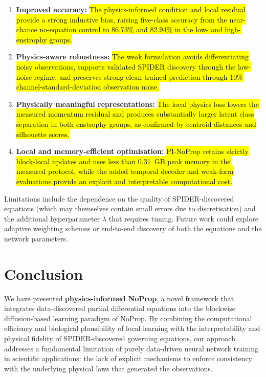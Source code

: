 \documentclass[preprint,12pt]{elsarticle}
\newcommand{\rev}[1]{\hl{#1}}
\begin{document}
\begin{enumerate}
    \item \textbf{Improved accuracy:} \rev{The physics-informed condition and local residual provide a strong inductive bias, raising five-class accuracy from the near-chance no-equation control to 86.73\% and 82.94\% in the low- and high-enstrophy groups.}
    \item \textbf{Physics-aware robustness:} \rev{The weak formulation avoids differentiating noisy observations, supports validated SPIDER discovery through the low-noise regime, and preserves strong clean-trained prediction through 10\% channel-standard-deviation observation noise.}
    \item \textbf{Physically meaningful representations:} \rev{The local physics loss lowers the measured momentum residual and produces substantially larger latent class separation in both enstrophy groups, as confirmed by centroid distances and silhouette scores.}
    \item \textbf{Local and memory-efficient optimisation:} \rev{PI-NoProp retains strictly block-local updates and uses less than 0.31~GB peak memory in the measured protocol, while the added temporal decoder and weak-form evaluations provide an explicit and interpretable computational cost.}
\end{enumerate}

Limitations include the dependence on the quality of SPIDER-discovered equations (which may themselves contain small errors due to discretisation) and the additional hyperparameter $\lambda$ that requires tuning. Future work could explore adaptive weighting schemes or end-to-end discovery of both the equations and the network parameters.



\section{Conclusion}
\label{sec:conclusion}

We have presented \textbf{physics-informed NoProp}, a novel framework that integrates data-discovered partial differential equations into the blockwise diffusion-based learning paradigm of NoProp. By combining the computational efficiency and biological plausibility of local learning with the interpretability and physical fidelity of SPIDER-discovered governing equations, our approach addresses a fundamental limitation of purely data-driven neural network training in scientific applications: the lack of explicit mechanisms to enforce consistency with the underlying physical laws that generated the observations.
\end{document}
